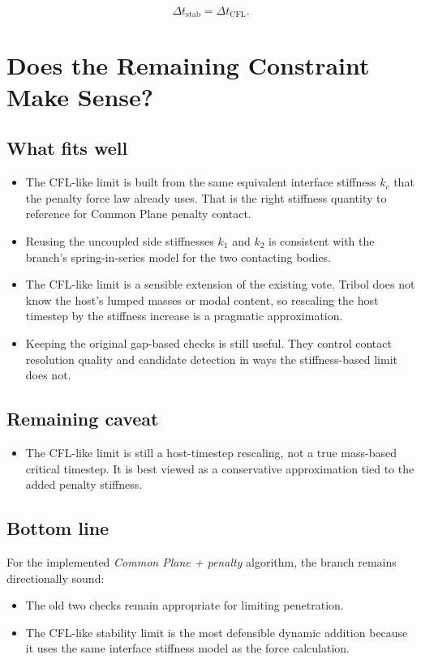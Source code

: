 \documentclass[11pt]{article}
\begin{document}
\[
  \Delta t_{\mathrm{stab}} = \Delta t_{\mathrm{CFL}}.
\]

\section{Does the Remaining Constraint Make Sense?}

\subsection*{What fits well}

\begin{itemize}[leftmargin=*]
\item The CFL-like limit is built from the same equivalent interface stiffness $k_c$ that the penalty force law already uses. That is the right stiffness quantity to reference for Common Plane penalty contact.
\item Reusing the uncoupled side stiffnesses $k_1$ and $k_2$ is consistent with the branch's spring-in-series model for the two contacting bodies.
\item The CFL-like limit is a sensible extension of the existing vote. Tribol does not know the host's lumped masses or modal content, so rescaling the host timestep by the stiffness increase is a pragmatic approximation.
\item Keeping the original gap-based checks is still useful. They control contact resolution quality and candidate detection in ways the stiffness-based limit does not.
\end{itemize}

\subsection*{Remaining caveat}

\begin{itemize}[leftmargin=*]
\item The CFL-like limit is still a host-timestep rescaling, not a true mass-based critical timestep. It is best viewed as a conservative approximation tied to the added penalty stiffness.
\end{itemize}

\subsection*{Bottom line}

For the implemented \emph{Common Plane + penalty} algorithm, the branch remains directionally sound:
\begin{itemize}[leftmargin=*]
\item The old two checks remain appropriate for limiting penetration.
\item The CFL-like stability limit is the most defensible dynamic addition because it uses the same interface stiffness model as the force calculation.
\end{itemize}
\end{document}
